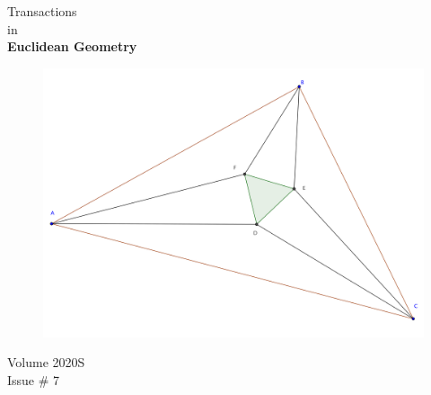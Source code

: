 \documentclass{report}
\begin{document}
\thispagestyle{empty}
\begin{center}
{\Huge Transactions\\ in\\[.2in] \textbf{Euclidean Geometry}}
\vspace{1in}

\begin{figure}[h!]
\includegraphics[width=1.1\textwidth]{cover-image.png}
\end{figure}

\vspace{.5in}

{\Large Volume 2020S}\\[.25in]
{\Huge Issue \# 7}
\end{center}

\clearpage
\end{document}

